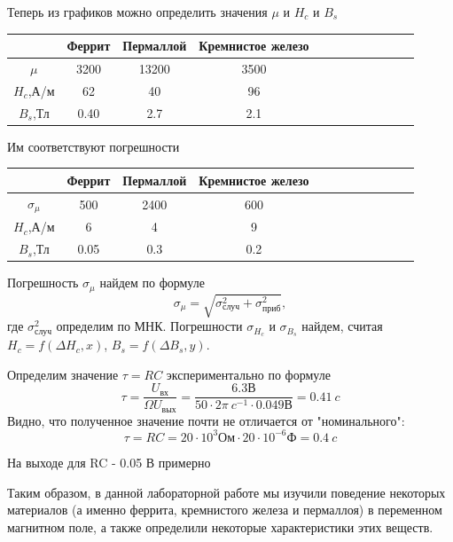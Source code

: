 \documentclass[14pt]{article}
\begin{document}
\vspace{1cm}
Теперь из графиков можно определить значения $\mu$ и $H_c$ и $B_s$

\begin{center}
\begin{tabular}{|c|c|c|c|c|c|c|c|c|c|c|c|}
\hline
			&	Феррит	&	Пермаллой	&	Кремнистое железо	\\
\hline
$\mu$		&	3200	&	13200		&	3500				\\
\hline
$H_c$,А/м	&	62		&	40			&	96					\\
\hline
$B_s$,Тл	&	0.40	&	2.7			&	2.1					\\
\hline
\end{tabular}
\end{center}

Им соответствуют погрешности

\begin{center}
\begin{tabular}{|c|c|c|c|c|c|c|c|c|c|c|c|}
\hline
				&	Феррит	&	Пермаллой	&	Кремнистое железо	\\
\hline
$\sigma_\mu$	&	500 	&	2400		&	600					\\
\hline
$H_c$,А/м		&	6		&	4			&	9					\\
\hline
$B_s$,Тл		&	0.05	&	0.3			&	0.2					\\
\hline
\end{tabular}
\end{center}

Погрешность $\sigma_\mu$ найдем по формуле
$$
	\sigma_\mu = \sqrt{\sigma^2_\text{случ} + \sigma^2_\text{приб}},
$$
где $\sigma^2_\text{случ}$ определим по МНК. 
Погрешности $\sigma_{H_c}$ и $\sigma_{B_s}$ найдем, считая $H_c = f(\Delta H_c, x)$, $B_s = f(\Delta B_s, y)$.

\vspace{1cm}
Определим значение $\tau = RC$ экспериментально по формуле
$$
	\tau = \frac{U_\text{вх}}{\Omega U_\text{вых}} = \frac{6.3 \text{В}}{50\cdot2\pi~c^{-1} \cdot 0.049 \text{В}} = 0.41~c
$$
Видно, что полученное значение почти не отличается от "номинального":
$$
	\tau = RC = 20\cdot10^{3}\text{Ом} \cdot 20\cdot10^{-6}\text{Ф} = 0.4~c
$$

На выходе для RC - 0.05 В примерно

\newpage
Таким образом, в данной лабораторной работе мы изучили поведение некоторых материалов (а именно феррита, кремнистого железа и пермаллоя) в переменном магнитном поле, а также определили некоторые характеристики этих веществ. 
\end{document}
